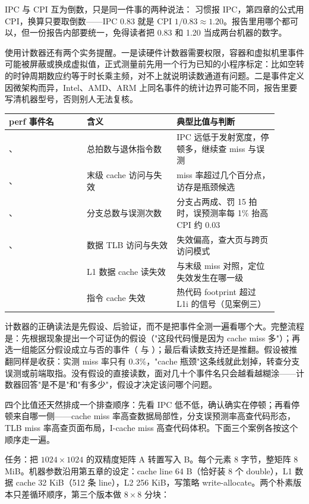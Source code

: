 IPC 与 CPI 互为倒数，只是同一件事的两种说法： 习惯报 IPC，第四章的公式用 CPI，换算只要取倒数——IPC 0.83 就是 CPI $1/0.83\approx1.20$。报告里用哪个都可以，但一份报告内部要统一，免得读者把 0.83 和 1.20 当成两台机器的数字。

使用计数器还有两个实务提醒。一是读硬件计数器需要权限，容器和虚拟机里事件可能被屏蔽或换成虚拟值，正式测量前先用一个行为已知的小程序标定：比如空转的时钟周期数应约等于时长乘主频，对不上就说明读数通道有问题。二是事件定义因微架构而异，Intel、AMD、ARM 上同名事件的统计边界可能不同，报告里要写清机器型号，否则别人无法复核。

\begin{longtable}{L{0.26\linewidth}L{0.30\linewidth}L{0.34\linewidth}}
\toprule
perf 事件名 & 含义 & 典型比值与判断 \\
\midrule
{}、 & 总拍数与退休指令数 & IPC 远低于发射宽度，停顿多，继续查 miss 与误测 \\
、 & 末级 cache 访问与失效 & miss 率超过几个百分点，访存是瓶颈候选 \\
、 & 分支总数与误测次数 & 分支占两成、罚 15 拍时，误预测率每 1\% 抬高 CPI 约 0.03 \\
、 & 数据 TLB 访问与失效 & 失效偏高，查大页与跨页访问模式 \\
 & L1 数据 cache 读失效 & 与末级 miss 对照，定位失效发生在哪一级 \\
 & 指令 cache 失效 & 热代码 footprint 超过 L1i 的信号（见案例三） \\
\bottomrule
\end{longtable}

计数器的正确读法是先假设、后验证，而不是把事件全测一遍看哪个大。完整流程是：先根据现象提出一个可证伪的假设（"这段代码慢是因为 cache miss 多"）；再选一组能区分假设成立与否的事件（ 与 ）；最后看读数支持还是推翻。假设被推翻同样是收获：实测 miss 率只有 0.3\%，"cache 瓶颈"这条线就此划掉，转查分支误测或前端取指。没有假设的直接读数，面对几十个事件名只会越看越糊涂——计数器回答"是不是"和"有多少"，假设才决定该问哪个问题。

四个比值还天然排成一个排查顺序：先看 IPC 低不低，确认确实在停顿；再看停顿来自哪一侧——cache miss 率高查数据局部性，分支误预测率高查代码形态，TLB miss 率高查页面布局，I-cache miss 高查代码体积。下面三个案例各按这个顺序走一遍。

任务：把 $1024\times1024$ 的双精度矩阵 A 转置写入 B。每个元素 8 字节，整矩阵 8 MiB。机器参数沿用第五章的设定：cache line 64 B（恰好装 8 个 double），L1 数据 cache 32 KiB（512 条 line），L2 256 KiB，写策略 write-allocate。两个朴素版本只差循环顺序，第三个版本做 $8\times8$ 分块：

